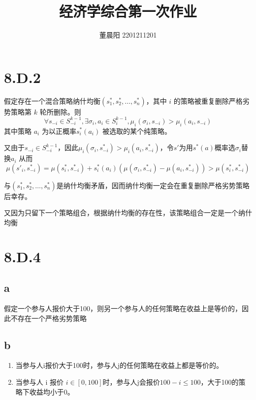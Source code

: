 \documentclass[a4paper,12pt]{ctexart}
\title{经济学综合第一次作业}
\author{董晨阳 2201211201}
\begin{document}
\maketitle
\section{8.D.2}

假定存在一个混合策略纳什均衡$(s_1^*,s_2^*,\dots,s_n^*)$，其中 $i$ 的策略被重复删除严格劣势策略第 $k$ 轮所删除。则
\begin{equation}
    \forall s_{-i}\in S_{-i}^{k-1},\exists \sigma_i,a_i\in S_i^{k-1}, \mu_i(\sigma_i,s_{-i})>\mu_i(a_i,s_{-i})
\end{equation}
其中策略 $a_i$ 为以正概率$s_i^*(a_i)$ 被选取的某个纯策略。

又由于$s_{-i}\in S_{-i}^{k-1}$，因此$\mu_i(\sigma_i,s^*_{-i})>\mu_i(a_i,s^*_{-i})$，令$s'$为用$s^*(a)$概率选$\sigma_i$替换$a_i$
从而
\begin{equation}
    \mu(s'_i,s_{-i}^*)=\mu(s_i^*,s^*_{-i})+s^*_i(a_i)(\mu(\sigma_i,s_{-i}^*)-\mu(a_i,s_{-i}^*))>\mu(s_i^*,s_{-i}^*)
\end{equation}

与$(s_1^*,s_2^*,\dots,s_n^*)$是纳什均衡矛盾，因而纳什均衡一定会在重复删除严格劣势策略后幸存。

又因为只留下一个策略组合，根据纳什均衡的存在性，该策略组合一定是一个纳什均衡

\section{8.D.4}

\subsection{a}

假定一个参与人报价大于100，则另一个参与人的任何策略在收益上是等价的，因此不存在一个严格劣势策略

\subsection{b}

\begin{enumerate}
    \item 当参与人i报价大于100时，参与人j的任何策略在收益上都是等价的。
    \item 当参与人 i 报价 $i\in[0,100]$时，参与人j会报价$100-i\le 100$，大于100的策略下收益均小于0。
\end{enumerate}
\end{document}

